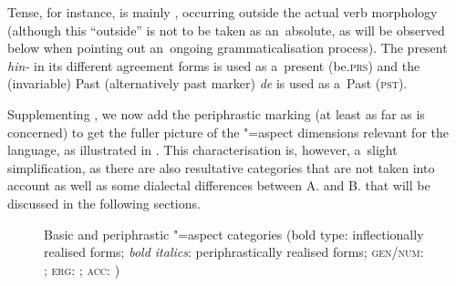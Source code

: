 Tense, for instance, is mainly , occurring outside the actual verb morphology (although this ``outside'' is not to be taken as an~absolute, as will be observed below when pointing out an~ongoing grammaticalisation process). The present   \textit{hin-} in its different agreement forms is used as a~present   (be.\textsc{prs}) and the (invariable) Past   (alternatively past  marker) \textit{de} is used as a~Past   (\textsc{pst}).



Supplementing , we now add the periphrastic marking (at least as far as  is concerned) to get the fuller picture of the "=aspect dimensions relevant for the language, as illustrated in . This characterisation is, however, a~slight simplification, as there are also resultative categories that are not taken into account as well as some dialectal differences between A. and B. that will be discussed in the following sections.


\begin{figure}[ht]
\centering
{}
\caption{Basic and periphrastic "=aspect categories (bold type: inflectionally realised forms;
  \textit{bold italics}: periphrastically realised forms; \textsc{gen/num}: ;
  \textsc{erg}: ; \textsc{acc}:  )\label{fig:9-2}}
\end{figure}

